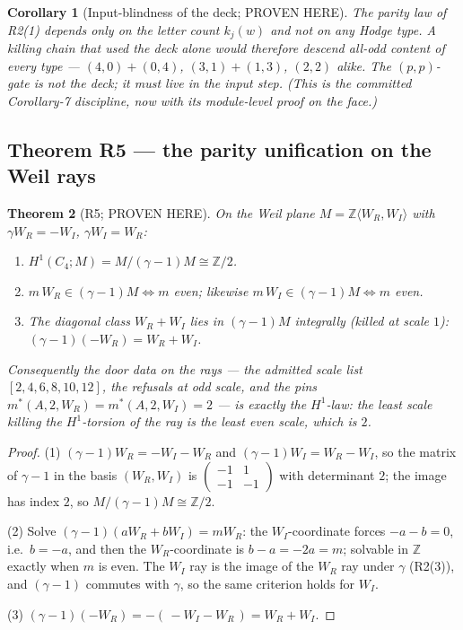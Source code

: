 \documentclass[11pt]{article}
\newtheorem{theorem}{Theorem}
\newtheorem{corollary}[theorem]{Corollary}
\newcommand{\Z}{\mathbb Z}
\begin{document}
\begin{corollary}[Input-blindness of the deck; PROVEN HERE]
The parity law of R2(1) depends only on the letter count $k_j(w)$ and
not on any Hodge type. A killing chain that used the deck alone would
therefore descend all-odd content of \emph{every} type ---
$(4,0)+(0,4)$, $(3,1)+(1,3)$, $(2,2)$ alike. The $(p,p)$-gate is not
the deck; it must live in the input step. (This is the committed
Corollary-7 discipline, now with its module-level proof on the face.)
\end{corollary}

\subsection{Theorem R5 --- the parity unification on the Weil rays}

\begin{theorem}[R5; PROVEN HERE]
On the Weil plane $M=\Z\langle W_R,W_I\rangle$ with
$\gamma W_R=-W_I$, $\gamma W_I=W_R$:
\begin{enumerate}
\item $H^1(C_4;M)=M/(\gamma-1)M\cong\Z/2$.
\item $m\,W_R\in(\gamma-1)M\iff m$ even; likewise $m\,W_I\in(\gamma-1)M
\iff m$ even.
\item The diagonal class $W_R+W_I$ lies in $(\gamma-1)M$ integrally
(killed at scale $1$): $(\gamma-1)(-W_R)=W_R+W_I$.
\end{enumerate}
Consequently the door data on the rays --- the admitted scale list
$[2,4,6,8,10,12]$, the refusals at odd scale, and the pins
$m^*(A,2,W_R)=m^*(A,2,W_I)=2$ --- is exactly the $H^1$-law: the least
scale killing the $H^1$-torsion of the ray is the least even scale,
which is $2$.
\end{theorem}

\begin{proof}
(1) $(\gamma-1)W_R=-W_I-W_R$ and $(\gamma-1)W_I=W_R-W_I$, so the matrix
of $\gamma-1$ in the basis $(W_R,W_I)$ is
$\left(\begin{smallmatrix}-1&1\\-1&-1\end{smallmatrix}\right)$ with
determinant $2$; the image has index $2$, so
$M/(\gamma-1)M\cong\Z/2$.

(2) Solve $(\gamma-1)(aW_R+bW_I)=mW_R$: the $W_I$-coordinate forces
$-a-b=0$, i.e.\ $b=-a$, and then the $W_R$-coordinate is $b-a=-2a=m$;
solvable in $\Z$ exactly when $m$ is even. The $W_I$ ray is the image of
the $W_R$ ray under $\gamma$ (R2(3)), and $(\gamma-1)$ commutes with
$\gamma$, so the same criterion holds for $W_I$.

(3) $(\gamma-1)(-W_R)=-(\,-W_I-W_R\,)=W_R+W_I$.
\end{proof}
\end{document}
